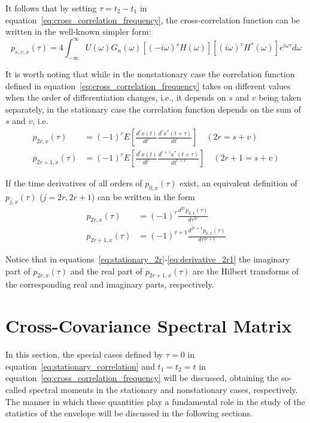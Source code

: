 \documentclass[11pt]{article}
\begin{document}
It follows that by setting $\tau = t_2 - t_1$ in equation~\eqref{eq:cross_correlation_frequency}, the cross-correlation function can be written in the well-known simpler form:
\begin{equation}
p_{s,v,x}(\tau) = 4 \int_{-\infty}^{\infty} U(\omega) G_n(\omega) [(-i\omega)^s H(\omega)][(i\omega)^v H^*(\omega)] e^{i\omega\tau} d\omega
\label{eq:stationary_correlation}
\end{equation}

It is worth noting that while in the nonstationary case the correlation function defined in equation~\eqref{eq:cross_correlation_frequency} takes on different values when the order of differentiation changes, i.e., it depends on $s$ and $v$ being taken separately, in the stationary case the correlation function depends on the sum of $s$ and $v$, i.e.
\begin{align}
p_{2r,x}(\tau) &= (-1)^r E\left[\frac{d^r x(t)}{dt^r} \frac{d^r x^*(t + \tau)}{dt^r}\right] \quad (2r = s + v) \label{eq:stationary_2r}\\
p_{2r+1,x}(\tau) &= (-1)^r E\left[\frac{d^r x(t)}{dt^r} \frac{d^{r+1} x^*(t + \tau)}{dt^{r+1}}\right] \quad (2r+1 = s + v) \label{eq:stationary_2r1}
\end{align}

If the time derivatives of all orders of $p_{0,x}(\tau)$ exist, an equivalent definition of $p_{j,x}(\tau)$ ($j = 2r, 2r+1$) can be written in the form
\begin{align}
p_{2r,x}(\tau) &= (-1)^r \frac{d^{2r} p_{0,x}(\tau)}{d\tau^{2r}} \label{eq:derivative_2r}\\
p_{2r+1,x}(\tau) &= (-1)^{r+1} \frac{d^{2r+1} p_{0,x}(\tau)}{d\tau^{2r+1}} \label{eq:derivative_2r1}
\end{align}

Notice that in equations~\eqref{eq:stationary_2r}-\eqref{eq:derivative_2r1} the imaginary part of $p_{2r,x}(\tau)$ and the real part of $p_{2r+1,x}(\tau)$ are the Hilbert transforms of the corresponding real and imaginary parts, respectively.

\section{Cross-Covariance Spectral Matrix}
\label{sec:spectral_matrix}

In this section, the special cases defined by $\tau = 0$ in equation~\eqref{eq:stationary_correlation} and $t_1 = t_2 = t$ in equation~\eqref{eq:cross_correlation_frequency} will be discussed, obtaining the so-called spectral moments in the stationary and nonstationary cases, respectively. The manner in which these quantities play a fundamental role in the study of the statistics of the envelope will be discussed in the following sections.
\end{document}
